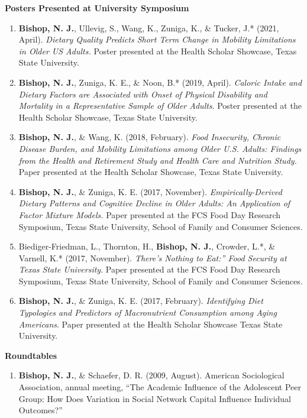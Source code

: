 \documentclass[
]{article}
\providecommand{\tightlist}{%
  \setlength{\itemsep}{0pt}\setlength{\parskip}{0pt}}
\begin{document}
\textbf{Posters Presented at University Symposium}

\begin{enumerate}
\def\labelenumi{\arabic{enumi}.}
\item
  \textbf{Bishop, N. J.}, Ullevig, S., Wang, K., Zuniga, K., \& Tucker,
  J.* (2021, April). \emph{Dietary Quality Predicts Short Term Change in
  Mobility Limitations in Older US Adults.} Poster presented at the
  Health Scholar Showcase, Texas State University.
\item
  \textbf{Bishop, N. J.}, Zuniga, K. E., \& Noon, B.* (2019, April).
  \emph{Caloric Intake and Dietary Factors are Associated with Onset of
  Physical Disability and Mortality in a Representative Sample of Older
  Adults}. Poster presented at the Health Scholar Showcase, Texas State
  University.
\item
  \textbf{Bishop, N. J.}, \& Wang, K. (2018, February). \emph{Food
  Insecurity, Chronic Disease Burden, and Mobility Limitations among
  Older U.S. Adults: Findings from the Health and Retirement Study and
  Health Care and Nutrition Study.} Paper presented at the Health
  Scholar Showcase, Texas State University.
\item
  \textbf{Bishop, N. J.}, \& Zuniga, K. E. (2017, November).
  \emph{Empirically-Derived Dietary Patterns and Cognitive Decline in
  Older Adults: An Application of Factor Mixture Models.} Paper
  presented at the FCS Food Day Research Symposium, Texas State
  University, School of Family and Consumer Sciences.
\item
  Biediger-Friedman, L., Thornton, H., \textbf{Bishop, N. J.}, Crowder,
  L.*, \& Varnell, K.* (2017, November). \emph{There's Nothing to Eat:''
  Food Security at Texas State University}. Paper presented at the FCS
  Food Day Research Symposium, Texas State University, School of Family
  and Consumer Sciences.
\item
  \textbf{Bishop, N. J.}, \& Zuniga, K. E. (2017, February).
  \emph{Identifying Diet Typologies and Predictors of Macronutrient
  Consumption among Aging Americans}. Paper presented at the Health
  Scholar Showcase Texas State University.
\end{enumerate}

\textbf{Roundtables}

\begin{enumerate}
\def\labelenumi{\arabic{enumi}.}
\tightlist
\item
  \textbf{Bishop, N. J.}, \& Schaefer, D. R. (2009, August). American
  Sociological Association, annual meeting, ``The Academic Influence of
  the Adolescent Peer Group: How Does Variation in Social Network
  Capital Influence Individual Outcomes?''
\end{enumerate}
\end{document}
